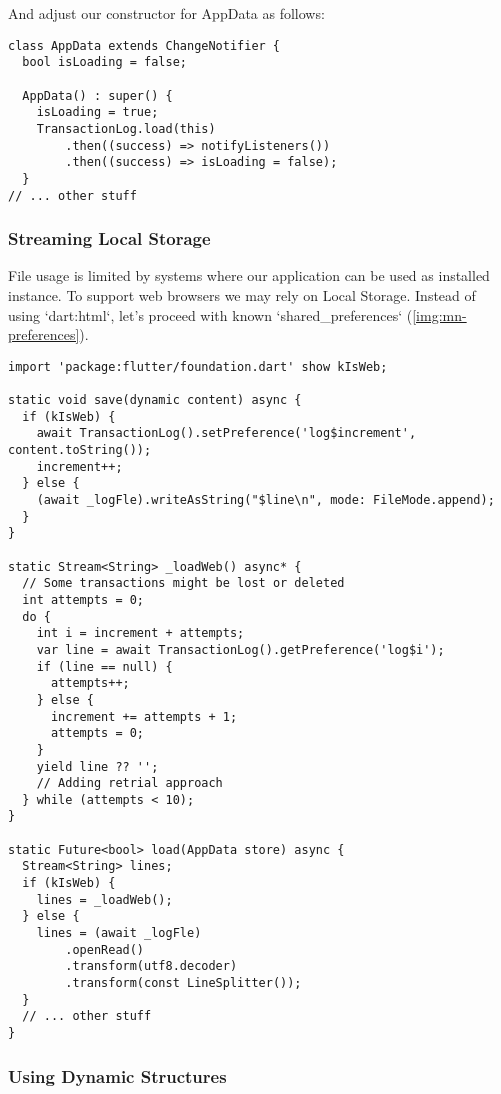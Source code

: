And adjust our constructor for AppData as follows:

\begin{lstlisting}
class AppData extends ChangeNotifier {
  bool isLoading = false;

  AppData() : super() {
    isLoading = true;
    TransactionLog.load(this)
        .then((success) => notifyListeners())
        .then((success) => isLoading = false);
  }
// ... other stuff
\end{lstlisting}


\subsubsection{Streaming Local Storage}

File usage is limited by systems where our application can be used as installed instance. To support web browsers
we may rely on Local Storage. Instead of using `dart:html`, let's proceed with known `shared\_preferences` (\cref{img:mn-preferences}).

\begin{lstlisting}
import 'package:flutter/foundation.dart' show kIsWeb;

static void save(dynamic content) async {
  if (kIsWeb) {
    await TransactionLog().setPreference('log$increment', content.toString());
    increment++;
  } else {
    (await _logFle).writeAsString("$line\n", mode: FileMode.append);
  }
}

static Stream<String> _loadWeb() async* {
  // Some transactions might be lost or deleted
  int attempts = 0;
  do {
    int i = increment + attempts;
    var line = await TransactionLog().getPreference('log$i');
    if (line == null) {
      attempts++;
    } else {
      increment += attempts + 1;
      attempts = 0;
    }
    yield line ?? '';
    // Adding retrial approach
  } while (attempts < 10);
}

static Future<bool> load(AppData store) async {
  Stream<String> lines;
  if (kIsWeb) {
    lines = _loadWeb();
  } else {
    lines = (await _logFle)
        .openRead()
        .transform(utf8.decoder)
        .transform(const LineSplitter());
  }
  // ... other stuff
}
\end{lstlisting}



\subsubsection{Using Dynamic Structures}

